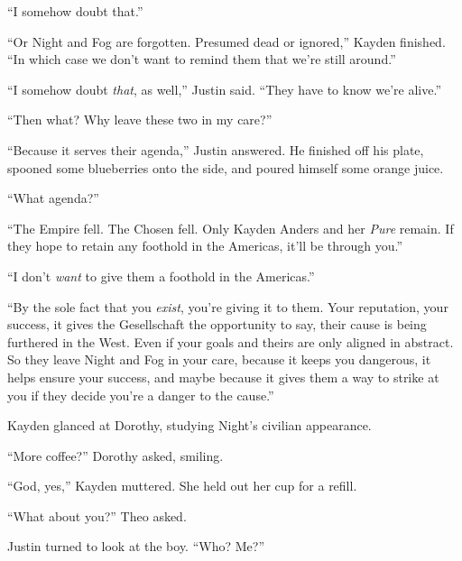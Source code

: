 ``I somehow doubt that.''



``Or Night and Fog are forgotten.  Presumed dead or ignored,'' Kayden finished.  ``In which case we don't want to remind them that we're still around.''



``I somehow doubt \emph{that}, as well,'' Justin said.  ``They have to know we're alive.''



``Then what?  Why leave these two in my care?''



``Because it serves their agenda,'' Justin answered.  He finished off his plate, spooned some blueberries onto the side, and poured himself some orange juice.



``What agenda?''



``The Empire fell.  The Chosen fell.  Only Kayden Anders and her \emph{Pure} remain.  If they hope to retain any foothold in the Americas, it'll be through you.''



``I don't \emph{want} to give them a foothold in the Americas.''



``By the sole fact that you \emph{exist}, you're giving it to them.  Your reputation, your success, it gives the Gesellschaft the opportunity to say, their cause is being furthered in the West.  Even if your goals and theirs are only aligned in abstract.  So they leave Night and Fog in your care, because it keeps you dangerous, it helps ensure your success, and maybe because it gives them a way to strike at you if they decide you're a danger to the cause.''



Kayden glanced at Dorothy, studying Night's civilian appearance.



``More coffee?'' Dorothy asked, smiling.



``God, yes,'' Kayden muttered.  She held out her cup for a refill.



``What about you?'' Theo asked.



Justin turned to look at the boy.  ``Who?  Me?''



